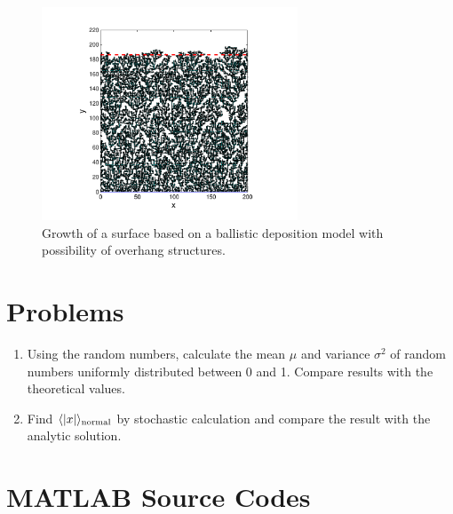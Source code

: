\begin{figure}
\centering
\includegraphics[width=3in]{15.Random-Numbers/bd3-height.pdf}
\caption{Growth of a surface based on a ballistic deposition model with possibility of overhang structures.}
\label{fig:bd3_height}
\end{figure}

\noindent
\section{Problems}

\begin{enumerate}[labelwidth=0.5cm,labelindent=0cm,leftmargin=*,label=\bfseries \thechapter.\arabic*,align=left]
\item
Using the random numbers, calculate the mean $\mu$ and variance $\sigma^2$ of random numbers uniformly distributed between 0 and 1.  Compare results with the theoretical values.
\item
Find $\langle |x| \rangle_\text{normal}$ by stochastic calculation and compare the result with the analytic solution.
\end{enumerate}

\newpage
\noindent
\section*{MATLAB Source Codes}


